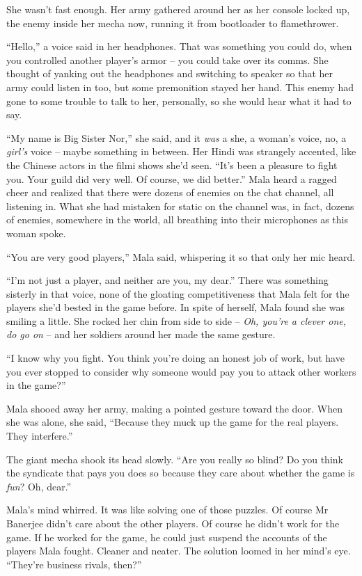 She wasn't fast enough. Her army gathered around her as her console
locked up, the enemy inside her mecha now, running it from
bootloader to flamethrower.

``Hello,'' a voice said in her headphones. That was something you
could do, when you controlled another player's armor -- you could
take over its comms. She thought of yanking out the headphones and
switching to speaker so that her army could listen in too, but some
premonition stayed her hand. This enemy had gone to some trouble to
talk to her, personally, so she would hear what it had to say.

``My name is Big Sister Nor,'' she said, and it \emph{was} a she, a
woman's voice, no, a \emph{girl's} voice -- maybe something in
between. Her Hindi was strangely accented, like the Chinese actors
in the filmi shows she'd seen. ``It's been a pleasure to fight you.
Your guild did very well. Of course, we did better.'' Mala heard a
ragged cheer and realized that there were dozens of enemies on the
chat channel, all listening in. What she had mistaken for static on
the channel was, in fact, dozens of enemies, somewhere in the
world, all breathing into their microphones as this woman spoke.

``You are very good players,'' Mala said, whispering it so that only
her mic heard.

``I'm not just a player, and neither are you, my dear.'' There was
something sisterly in that voice, none of the gloating
competitiveness that Mala felt for the players she'd bested in the
game before. In spite of herself, Mala found she was smiling a
little. She rocked her chin from side to side --
\emph{Oh, you're a clever one, do go on} -- and her soldiers around
her made the same gesture.

``I know why you fight. You think you're doing an honest job of
work, but have you ever stopped to consider why someone would pay
you to attack other workers in the game?''

Mala shooed away her army, making a pointed gesture toward the
door. When she was alone, she said, ``Because they muck up the game
for the real players. They interfere.''

The giant mecha shook its head slowly. ``Are you really so blind? Do
you think the syndicate that pays you does so because they care
about whether the game is \emph{fun}? Oh, dear.''

Mala's mind whirred. It was like solving one of those puzzles. Of
course Mr Banerjee didn't care about the other players. Of course
he didn't work for the game. If he worked for the game, he could
just suspend the accounts of the players Mala fought. Cleaner and
neater. The solution loomed in her mind's eye. ``They're business
rivals, then?''

